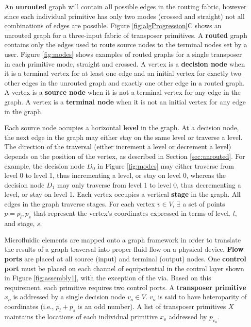 An \textbf{unrouted} graph will contain all possible edges in the routing fabric, however since each individual primitive has only two modes (crossed and straight) not all combinations of edges are possible. Figure \ref{fig:algProgression}C shows an unrouted graph for a three-input fabric of transposer primitives. A \textbf{routed} graph contains only the edges used to route source nodes to the terminal nodes set by a user. Figure \ref{fig:modes} shows examples of routed graphs for a single transposer in each primitive mode, straight and crossed. A vertex is a \textbf{decision node} when it is a terminal vertex for at least one edge and an initial vertex for exactly two other edges in the unrouted graph and exactly one other edge in a routed graph. A vertex is a \textbf{source node} when it is not a terminal vertex for any edge in the graph. A vertex is a \textbf{terminal node} when it is not an initial vertex for any edge in the graph.

Each source node occupies a horizontal \textbf{level} in the graph. At a decision node, the next edge in the graph may either stay on the same level or traverse a level. The direction of the traversal (either increment a level or decrement a level) depends on the position of the vertex, as described in Section \ref{sec:unrouted}. For example, the decision node $D_0$ in Figure \ref{fig:modes} may either traverse from level 0 to level 1, thus incrementing a level, or stay on level 0, whereas the decision node $D_1$ may only traverse from level 1 to level 0, thus decrementing a level, or stay on level 1. Each vertex occupies a vertical \textbf{stage} in the graph. All edges in the graph traverse stages. For each vertex $v\in V$, $\exists$ a set of points $p=p_l,p_s$ that represent the vertex's coordinates expressed in terms of level, $l$, and stage, $s$.

Microfluidic elements are mapped onto a graph framework in order to translate the results of a graph traversal into proper fluid flow on a physical device. \textbf{Flow ports} are placed at all source (input) and terminal (output) nodes. One \textbf{control port} must be placed on each channel of equipotential in the control layer shown in Figure \ref{fig:assembly1}, with the exception of the via. Based on this requirement, each primitive requires two control ports. A \textbf {transposer primitive} $x_o$ is addressed by a single decision node $v_o \in V$. $v_o$ is said to have heteroparity of coordinates (i.e., $p_l+p_s$ is an odd number). A list of transposer primitives $X$ maintains the locations of each individual primitive $x_o$ addressed by $p_{v_{o}}$.

